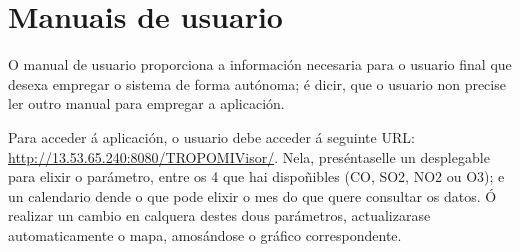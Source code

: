 \chapter{Manuais de usuario}

O manual de usuario proporciona a información necesaria para o usuario final que desexa empregar o sistema de forma autónoma; é dicir, que o usuario non precise ler outro manual para empregar a
aplicación.

Para acceder á aplicación, o usuario debe acceder á seguinte URL: \url{http://13.53.65.240:8080/TROPOMIVisor/}. Nela, preséntaselle un desplegable para elixir o parámetro, entre os 4 que hai dispoñibles
(CO, SO2, NO2 ou O3); e un calendario dende o que pode elixir o mes do que quere consultar os datos. Ó realizar un cambio en calquera destes dous parámetros, actualizarase automaticamente o mapa,
amosándose o gráfico correspondente.